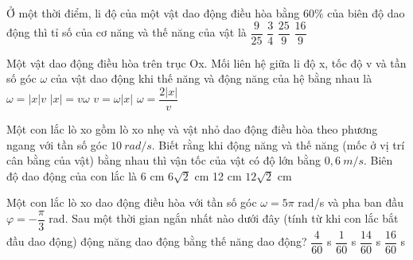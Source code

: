 \begin{vidu}%
Ở một thời điểm, li độ của một vật dao động điều hòa bằng 60\% của biên độ dao động thì tỉ số của cơ năng và thế năng của vật là
\choice
{$\dfrac{9}{25}$}
{$\dfrac{3}{4}$}
{\True $\dfrac{25}{9}$}
{$\dfrac{16}{9}$}
\end{vidu} %
\begin{vidu}%
Một vật dao động điều hòa trên trục Ox. Mối liên hệ giữa li độ x, tốc độ v và tần số góc $\omega$  của vật dao động khi thế năng và động năng của hệ bằng nhau là
\choice
{$\omega  = |x|v$}
{$|x| = v\omega$}
{\True $v = \omega |x|$}
{$ \omega =\dfrac{2\left| x \right|}{v}$}
\end{vidu} %
\begin{vidu} %
 Một con lắc lò xo gồm lò xo nhẹ và vật nhỏ dao động điều hòa theo phương ngang với tần số góc $10\ rad/s$. Biết rằng khi động năng và thế năng (mốc ở vị trí cân bằng của vật) bằng nhau thì vận tốc của vật có độ lớn bằng $0,6\ m/s$. Biên độ dao động của con lắc là
\choice
{6 cm}
{\True $6\sqrt{2}$ cm}
{12 cm}
{$12\sqrt{2}$ cm}
\end{vidu} %
\begin{vidu}%
Một con lắc lò xo dao động điều hòa với tần số góc $\omega = 5\pi$ rad/s và pha ban đầu $\varphi = -\dfrac{\pi}{3}$ rad. Sau một thời gian ngắn nhất nào dưới đây (tính từ khi con lắc bắt đầu dao động) động năng dao động bằng thế năng dao động?
\choice
{$\dfrac{4}{60}$ s}
{\True $\dfrac{1}{60}$ s}
{$\dfrac{14}{60}$ s}
{$\dfrac{16}{60}$ s}
\end{vidu} %
